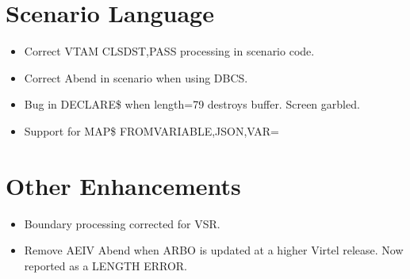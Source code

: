 \documentclass[letterpaper,10pt,english]{sphinxmanual}
\begin{document}
\newpage


\section{Scenario Language}
\label{\detokenize{TN202303:scenario-language}}
\sphinxAtStartPar
{}
\begin{itemize}
\item {} 
\sphinxAtStartPar
Correct VTAM CLSDST,PASS processing in scenario code.

\end{itemize}

\sphinxAtStartPar
{}
\begin{itemize}
\item {} 
\sphinxAtStartPar
Correct Abend in scenario when using DBCS.

\end{itemize}

\sphinxAtStartPar
{}
\begin{itemize}
\item {} 
\sphinxAtStartPar
Bug in DECLARE\$ when length=79 destroys buffer. Screen garbled.

\end{itemize}

\sphinxAtStartPar
{}
\begin{itemize}
\item {} 
\sphinxAtStartPar
Support for MAP\$ FROM\sphinxhyphen{}VARIABLE,JSON,VAR=

\end{itemize}

\newpage


\section{Other Enhancements}
\label{\detokenize{TN202303:other-enhancements}}
\sphinxAtStartPar
{}
\begin{itemize}
\item {} 
\sphinxAtStartPar
Boundary processing corrected for VSR.

\end{itemize}

\sphinxAtStartPar
{}
\begin{itemize}
\item {} 
\sphinxAtStartPar
Remove AEIV Abend when ARBO is updated at a higher Virtel release. Now reported as a LENGTH ERROR.

\end{itemize}
\end{document}

